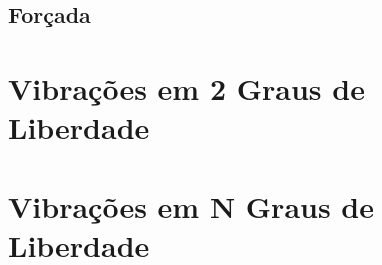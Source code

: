 \documentclass{article}
\begin{document}
\newpage\subsection{Forçada}



\newpage\section{Vibrações em 2 Graus de Liberdade}



\newpage\section{Vibrações em N Graus de Liberdade}
\end{document}
